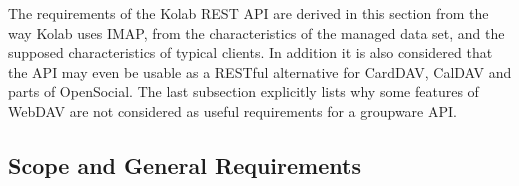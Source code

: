 \documentclass[11pt,a4paper,headsepline,twoside]{scrartcl}		%
\begin{document}
The requirements of the Kolab REST API are derived in this section from the way
Kolab uses IMAP, from the characteristics of the managed data set, and the
supposed characteristics of typical clients. In addition it is also considered
that the API may even be usable as a RESTful alternative for CardDAV, CalDAV and
parts of OpenSocial. The last subsection explicitly lists why some features of
WebDAV are not considered as useful requirements for a groupware API.




\subsection{Scope and General Requirements}
\end{document}
